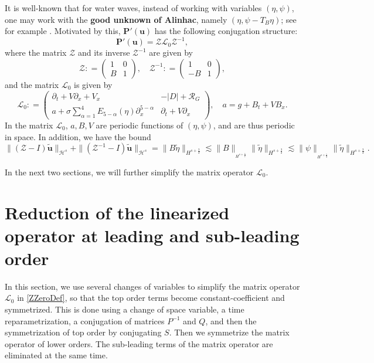 \documentclass[12pt]{amsart}
\theoremstyle{remark}
\theoremstyle{definition}
\numberwithin{equation}{section}
\newcommand{\p}{\partial}
\renewcommand{\H}{{\mathcal H }}
\newcommand{\al}{\alpha}
\newcommand{\f}{\frac}
\newcommand{\mZ}{\mathcal{Z}}
\begin{document}
It is well-known that for water waves, instead of working with variables $(\eta, \psi)$, one may work with the \textbf{good unknown of Alinhac}, namely $(\eta, \psi - T_{B}\eta )$; see for example \cite{MR2138139, MR2805065}.
Motivated by this, $\mathbf{P}'(\mathbf{u})$ has the following conjugation structure:
\begin{equation} \label{ZConjugation}
 \mathbf{P}'(\mathbf{u}) = \mathcal{Z}\mathcal{L}_0 \mathcal{Z}^{-1},   
\end{equation}
where the matrix $\mathcal{Z}$ and its inverse $ \mathcal{Z}^{-1}$ are given by
\begin{equation} \label{ZDef}
 \mathcal{Z} : = \begin{pmatrix}
   1 &   0 \\
    B&  1 
    \end{pmatrix}, \quad \mathcal{Z}^{-1} : = \begin{pmatrix}
   1 &   0 \\
   -B&  1 
    \end{pmatrix},
\end{equation}
and the matrix $\mathcal{L}_0$ is given by
\begin{equation} \label{ZZeroDef}
 \mathcal{L}_0 : = \begin{pmatrix}
   \p_t + V\p_x + V_x  &   -|D|+ \mathcal{R}_G \\
   a + \sigma \sum _{\al = 1}^4 E_{5-\al}(\eta)\p_x^{5-\al} &  \p_t + V\p_x 
    \end{pmatrix}, \quad a = g+ B_t + VB_x.
\end{equation}
In the matrix $\mathcal{L}_0$, $a, B, V$ are periodic functions of $(\eta, \psi)$, and are thus periodic in space.
In addition, we have the bound
\begin{equation} \label{ZBoundInverse}
\|(\mZ -I)\tilde{\mathbf{u}} \|_{\H^s} + \|(\mZ^{-1} -I)\tilde{\mathbf{u}} \|_{\H^s} = \|B\tilde{\eta} \|_{H^{s+\f32}} \lesssim \| B\|_{_{H^{s+\f32}}}\|\tilde{\eta}\|_{H^{s+\f32}} \lesssim \|\psi \|_{_{H^{s+\f52}}}\|\tilde{\eta}\|_{H^{s+\f32}}.
\end{equation}

In the next two sections, we will further simplify the matrix operator $\mathcal{L}_0$.


\section{Reduction of the linearized operator at leading and sub-leading order} \label{s:Top}
In this section, we use several changes of variables to simplify the matrix operator $\mathcal{L}_0$ in \eqref{ZZeroDef}, so that the top order terms become constant-coefficient and symmetrized.
This is done using a change of space variable, a time reparametrization, a conjugation of matrices $P^{-1}$ and $Q$, and then the symmetrization of top order by conjugating $S$.
Then we symmetrize the matrix operator of lower orders.
The sub-leading terms of the matrix operator are eliminated at the same time.
\end{document}
